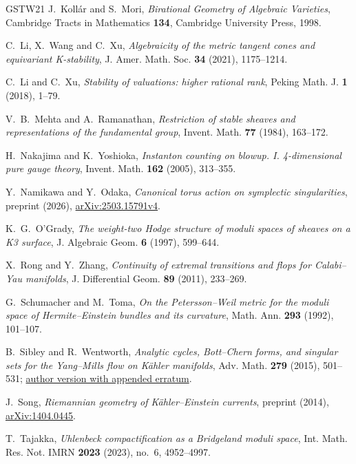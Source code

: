 \begin{thebibliography}{GSTW21}
J.~Koll\'ar and S.~Mori,
\emph{Birational Geometry of Algebraic Varieties},
Cambridge Tracts in Mathematics \textbf{134},
Cambridge University Press, 1998.

C.~Li, X.~Wang and C.~Xu,
\emph{Algebraicity of the metric tangent cones and equivariant K-stability},
J. Amer. Math. Soc. \textbf{34} (2021), 1175--1214.

C.~Li and C.~Xu,
\emph{Stability of valuations: higher rational rank},
Peking Math. J. \textbf{1} (2018), 1--79.

V.~B.~Mehta and A.~Ramanathan,
\emph{Restriction of stable sheaves and representations of the fundamental group},
Invent. Math. \textbf{77} (1984), 163--172.

H.~Nakajima and K.~Yoshioka,
\emph{Instanton counting on blowup. I. 4-dimensional pure gauge theory},
Invent. Math. \textbf{162} (2005), 313--355.

Y.~Namikawa and Y.~Odaka,
\emph{Canonical torus action on symplectic singularities},
preprint (2026),
\href{https://arxiv.org/abs/2503.15791v4}{arXiv:2503.15791v4}.

K.~G.~O'Grady,
\emph{The weight-two Hodge structure of moduli spaces of sheaves on a K3 surface},
J. Algebraic Geom. \textbf{6} (1997), 599--644.

X.~Rong and Y.~Zhang,
\emph{Continuity of extremal transitions and flops for Calabi--Yau manifolds},
J. Differential Geom. \textbf{89} (2011), 233--269.

G.~Schumacher and M.~Toma,
\emph{On the Petersson--Weil metric for the moduli space of
Hermite--Einstein bundles and its curvature},
Math. Ann. \textbf{293} (1992), 101--107.

B.~Sibley and R.~Wentworth,
\emph{Analytic cycles, Bott--Chern forms, and singular sets for the
Yang--Mills flow on K\"ahler manifolds},
Adv. Math. \textbf{279} (2015), 501--531;
\href{https://math.umd.edu/~raw/papers/Cycles.pdf}{author version with appended erratum}.

J.~Song,
\emph{Riemannian geometry of K\"ahler--Einstein currents},
preprint (2014), \href{https://arxiv.org/abs/1404.0445}{arXiv:1404.0445}.

T.~Tajakka,
\emph{Uhlenbeck compactification as a Bridgeland moduli space},
Int. Math. Res. Not. IMRN \textbf{2023} (2023), no.~6, 4952--4997.


\end{thebibliography}
